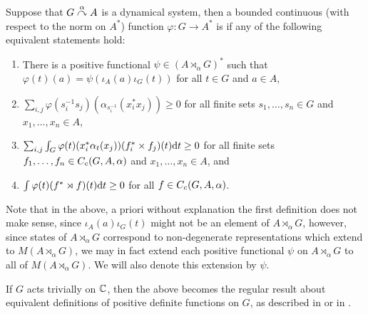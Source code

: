 \begin{definition}
Suppose that $G \stackrel{\alpha}{\curvearrowright} A$ is a dynamical system, then a bounded continuous (with respect to the norm on $A^*$) function $\varphi \colon G \to A^*$ is  if any of the following equivalent statements hold:
\begin{enumerate}[nosep]
	\item There is a positive functional $\psi \in (A \rtimes_\alpha G)^*$ such that $\varphi(t)(a) = \psi(\iota_A(a) \iota_G(t))$ for all $t \in G$ and $a \in A$,
	\item $\sum_{i,j} \varphi (s_i^{-1}s_j)(\alpha_{s_{i}^{-1}}(x_{i}^* x_{j})) \geq 0 $ for all finite sets $s_1,\dots,s_n \in G$ and $x_1,\dots,x_n \in A$,
	\item $\sum_{i,j}\int_G \varphi(t)(x_{i}^*\alpha_t(x_j))(f_i^* \times f_j)(t) \mathrm{d} t \geq 0$ for all finite sets $f_1,\dots,f_n \in C_c(G,A,\alpha)$ and $x_1,\dots,x_n \in A$, and
	\item $\int \varphi(t)(f^* \rtimes f)(t) \mathrm{d} t \geq 0$ for all $f \in C_c(G,A,\alpha)$.
\end{enumerate}
\end{definition}
\begin{remark}
Note that in the above, a priori without explanation the first definition does not make sense, since $\iota_A(a) \iota_G(t)$ might not be an element of $A \rtimes_\alpha G$, however, since states of $A \rtimes_\alpha G$ correspond to non-degenerate representations which extend to $M(A \rtimes_\alpha G)$, we may in fact extend each positive functional $\psi$ on $A \rtimes_\alpha G$ to all of $M(A \rtimes_\alpha G)$. We will also denote this extension by $\psi$. 
\end{remark}
If $G$ acts trivially on $\mathbb{C}$, then the above becomes the regular result about equivalent definitions of positive definite functions on $G$, as described in \cite{folland2016fourier} or in \cite{pedersenalgauto}.

